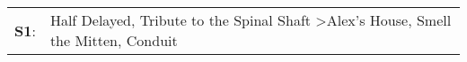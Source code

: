 \begin{supertabular}{p{0.03\textwidth}p{0.92\textwidth}}
 \textbf{S1}:  &  Half Delayed\textsuperscript{}, \enspace Tribute to the Spinal Shaft\textsuperscript{} \textgreater \enspace Alex's House\textsuperscript{}, \enspace Smell the Mitten\textsuperscript{}, \enspace Conduit\textsuperscript{}  \enspace  \\
\end{supertabular}
